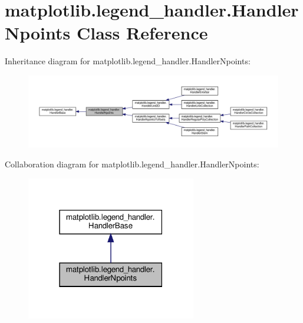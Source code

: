\hypertarget{classmatplotlib_1_1legend__handler_1_1HandlerNpoints}{}\section{matplotlib.\+legend\+\_\+handler.\+Handler\+Npoints Class Reference}
\label{classmatplotlib_1_1legend__handler_1_1HandlerNpoints}


Inheritance diagram for matplotlib.\+legend\+\_\+handler.\+Handler\+Npoints\+:
\nopagebreak
\begin{figure}[H]
\begin{center}
\leavevmode
\includegraphics[width=350pt]{classmatplotlib_1_1legend__handler_1_1HandlerNpoints__inherit__graph}
\end{center}
\end{figure}


Collaboration diagram for matplotlib.\+legend\+\_\+handler.\+Handler\+Npoints\+:
\nopagebreak
\begin{figure}[H]
\begin{center}
\leavevmode
\includegraphics[width=210pt]{classmatplotlib_1_1legend__handler_1_1HandlerNpoints__coll__graph}
\end{center}
\end{figure}
